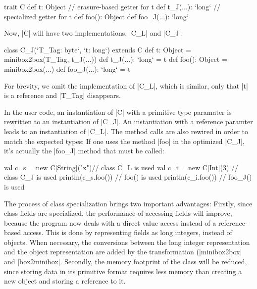 \begin{lstlisting-nobreak}
trait C {
  def t: Object // erasure-based getter for t
  def t_J(...): `long` // specialized getter for t
  def foo(): Object
  def foo_J(...): `long`
}
\end{lstlisting-nobreak}

Now, |C| will have two implementations, |C_L| and |C_J|:


\begin{lstlisting-nobreak}
class C_J(`T_Tag: byte`, `t: long`) extends C {
  def t: Object = minibox2box(T_Tag, t_J(...))
  def t_J(...): `long` = t
  def foo(): Object = minibox2box(...)
  def foo_J(...): `long` = t
}
\end{lstlisting-nobreak}

For brevity, we omit the implementation of |C_L|, which is similar, only that |t| is a reference and |T_Tag| disappears.

In the user code, an instantiation of |C| with a primitive type paramater is rewritten to an instantiation of |C_J|. An instantiation with a reference paramter leads to an instantiation of |C_L|. The method calls are also rewired in order to match the expected types: If one uses the method |foo| in the optimized |C_J|, it's actually the |foo_J| method that must be called:

\begin{lstlisting-nobreak}
val c_s = new C[String]("x")// class C_L is used
val c_i = new C[Int](3)              // class C_J is used
println(c_s.foo())   // foo() is used
println(c_i.foo())   // foo_J() is used
\end{lstlisting-nobreak}

The process of class specialization brings two important advantages: Firstly, since class fields are specialized, the performance of accessing fields will improve, because the program now deals with a direct value access instead of a reference-based access. This is done by representing fields as long integers, instead of objects. When necessary, the conversions between the long integer representation and the object representation are added by the transformation (|minibox2box| and |box2minibox|. Secondly, the memory footprint of the class will be reduced, since storing data in its primitive format requires less memory than creating a new object and storing a reference to it.

